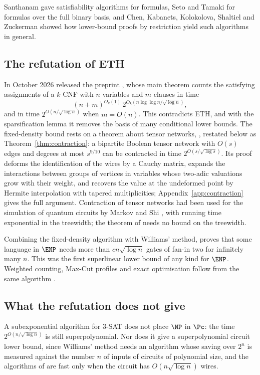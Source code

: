 Santhanam \cite{San10} gave satisfiability algorithms for formulas, Seto and
Tamaki \cite{ST13} for formulas over the full binary basis, and Chen, Kabanets,
Kolokolova, Shaltiel and Zuckerman \cite{CKKSZ15} showed how lower-bound proofs
by restriction yield such algorithms in general.

\subsection{The refutation of ETH}
In October 2026 \oai{} released the preprint \cite{OAI26}, whose main theorem
counts the satisfying assignments of a $k$-CNF with $n$ variables and $m$
clauses in time
\[
(n+m)^{O_k(1)}\,2^{O_k(n\log\log n/\sqrt{\log n})},
\]
and in time $2^{O(n/\sqrt{\log n})}$ when $m=O(n)$. This contradicts ETH, and
with the sparsification lemma it removes the basis of many conditional lower
bounds. The fixed-density bound rests on a theorem about tensor networks,
\cite[Theorem D.1]{OAI26}, restated below as Theorem~\ref{thm:contraction}: a
bipartite Boolean tensor network with $O(s)$ edges and degrees at most
$s^{9/10}$ can be contracted in time $2^{O(s/\sqrt{\log s})}$. Its proof
deforms the identification of the wires by a Cauchy matrix, expands the
interactions between groups of vertices in variables whose two-adic valuations
grow with their weight, and recovers the value at the undeformed point by
Hermite interpolation with tapered multiplicities; Appendix~\ref{app:contraction}
gives the full argument. Contraction of tensor networks had been used for the
simulation of quantum circuits by Markov and Shi \cite{MS08}, with running time
exponential in the treewidth; the theorem of \oai{} needs no bound on the
treewidth.

Combining the fixed-density algorithm with Williams' method, \cite[Corollary
1.4]{OAI26} proves that some language in $\ENP$ needs more than $cn\sqrt{\log
n}$ gates of fan-in two for infinitely many $n$. This was the first superlinear
lower bound of any kind for $\ENP$. Weighted counting, Max-Cut profiles and
exact optimisation follow from the same algorithm \cite{BhaHex26,Bha26eth}.

\subsection{What the refutation does not give}
A subexponential algorithm for $3$-SAT does not place $\NP$ in $\Pc$: the time
$2^{O(n/\sqrt{\log n})}$ is still superpolynomial. Nor does it give a
superpolynomial circuit lower bound, since Williams' method needs an algorithm
whose saving over $2^n$ is measured against the number $n$ of inputs of
circuits of polynomial size, and the algorithms of \cite{OAI26} are fast only
when the circuit has $O(n\sqrt{\log n})$ wires.

